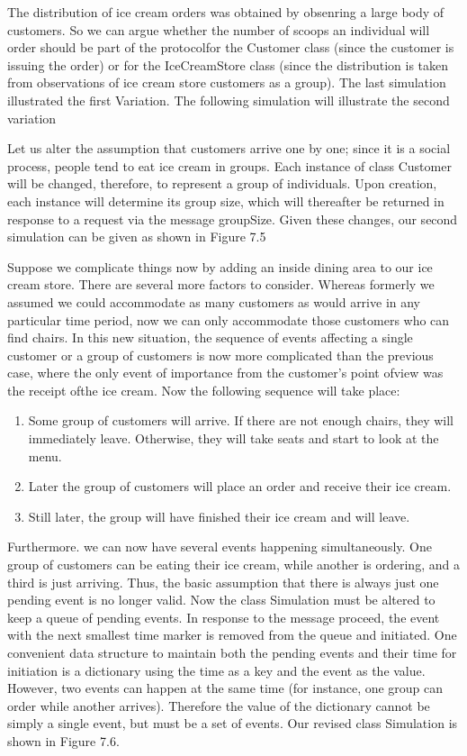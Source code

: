 
The distribution of ice cream orders was obtained by obsenring a large body of
customers. So we can argue whether the number of scoops an individual will order
should be part of the protocolfor the Customer class (since the customer is
issuing the order) or for the IceCreamStore class (since the distribution is
taken from observations of ice cream store customers as a group). The last
simulation illustrated the first Variation. The following simulation will
illustrate the second variation

Let us alter the assumption that customers arrive one by one; since it is a
social process, people tend to eat ice cream in groups. Each instance of class
Customer will be changed, therefore, to represent a group of individuals. Upon
creation, each instance will determine its group size, which will thereafter be
returned in response to a request via the message groupSize. Given these
changes, our second simulation can be given as shown in Figure 7.5

Suppose we complicate things now by adding an inside dining area to our ice
cream store. There are several more factors to consider. Whereas formerly we
assumed we could accommodate as many customers as would arrive in any particular
time period, now we can only accommodate those customers who can find chairs. In
this new situation, the sequence of events affecting a single customer or a
group of customers is now more complicated than the previous case, where the
only event of importance from the customer's point ofview was the receipt ofthe
ice cream. Now the following sequence will take place:
\begin{enumerate}
    \item Some group of customers will arrive. If there are not enough chairs,
    they will immediately leave. Otherwise, they will take seats and start to
    look at the menu.
    \item Later the group of customers will place an order and receive their ice
    cream.
    \item Still later, the group will have finished their ice cream and will
    leave.
\end{enumerate}

Furthermore. we can now have several events happening simultaneously. One group
of customers can be eating their ice cream, while another is ordering, and a
third is just arriving. Thus, the basic assumption that there is always just one
pending event is no longer valid. Now the class Simulation must be altered to
keep a queue of pending events. In response to the message proceed, the event
with the next smallest time marker is removed from the queue and initiated. One
convenient data structure to maintain both the pending events and their time for
initiation is a dictionary using the time as a key and the event as the value.
However, two events can happen at the same time (for instance, one group can
order while another arrives). Therefore the value of the dictionary cannot be
simply a single event, but must be a set of events. Our revised class Simulation
is shown in Figure 7.6.

